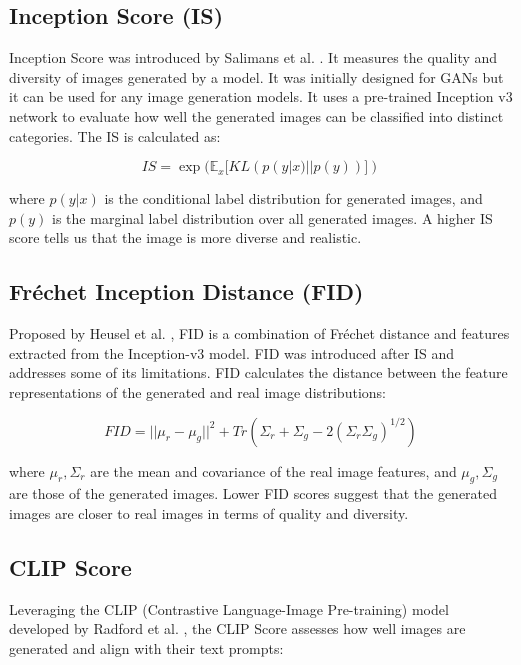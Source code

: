 \documentclass{article}
\begin{document}
\subsection{Inception Score (IS)}

Inception Score was introduced by Salimans et al. \cite{salimans2016improved}. It measures the quality and diversity of images 
generated by a model. It was initially designed for GANs but it can be used for any image generation models. 
It uses a pre-trained Inception v3 network to evaluate how well the generated images can be classified into distinct categories. 
The IS is calculated as:

\begin{equation}
    IS = \exp(\mathbb{E}_x[KL(p(y|x) || p(y))])
\end{equation}

where $p(y|x)$ is the conditional label distribution for generated images, and $p(y)$ is the marginal label distribution over all generated images.
A higher IS score tells us that the image is more diverse and realistic.


\subsection{Fréchet Inception Distance (FID)}

Proposed by Heusel et al. \cite{heusel2017gans}, FID is a combination of Fréchet distance and features extracted from the 
Inception-v3 model. FID was introduced after IS and addresses some of its limitations.
FID calculates the distance between the feature representations of the generated and real image distributions:

\begin{equation}
    FID = ||\mu_r - \mu_g||^2 + Tr(\Sigma_r + \Sigma_g - 2(\Sigma_r \Sigma_g)^{1/2})
\end{equation}

where $\mu_r, \Sigma_r$ are the mean and covariance of the real image features, and $\mu_g, \Sigma_g$ are those of the generated images.
 Lower FID scores suggest that the generated images are closer to real images in terms of quality and diversity.

\subsection{CLIP Score}

Leveraging the CLIP (Contrastive Language-Image Pre-training) model developed by Radford et al. \cite{radford2021learning}, 
the CLIP Score assesses how well images are generated and align with their text prompts:
\end{document}
